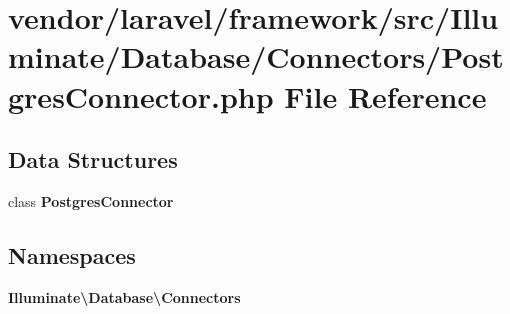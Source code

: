 \section{vendor/laravel/framework/src/\+Illuminate/\+Database/\+Connectors/\+Postgres\+Connector.php File Reference}
\label{_postgres_connector_8php}
\subsection*{Data Structures}
\begin{DoxyCompactItemize}
\item 
class {\bf Postgres\+Connector}
\end{DoxyCompactItemize}
\subsection*{Namespaces}
\begin{DoxyCompactItemize}
\item 
 {\bf Illuminate\textbackslash{}\+Database\textbackslash{}\+Connectors}
\end{DoxyCompactItemize}
